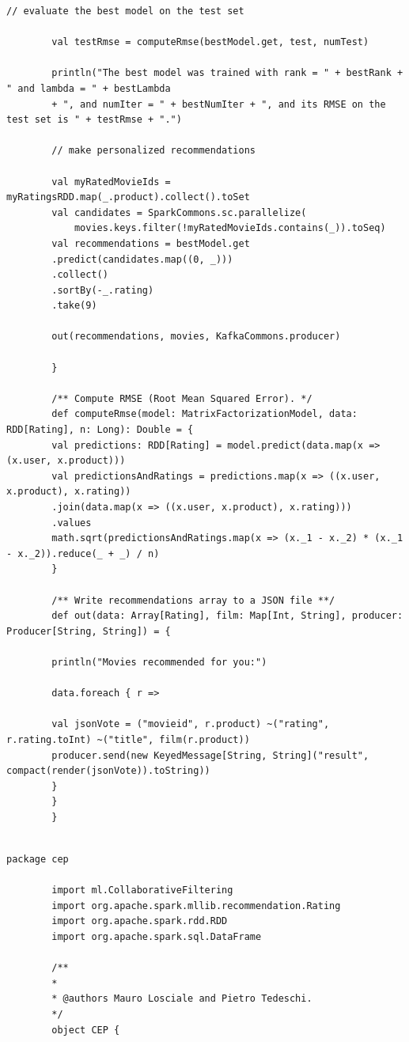 \documentclass[12pt]{article}
\begin{document}
\begin{appendices}
\begin{lstlisting}[style=scalacode, caption=CollaborativeFiltering.scala]
		// evaluate the best model on the test set
		
		val testRmse = computeRmse(bestModel.get, test, numTest)
		
		println("The best model was trained with rank = " + bestRank + " and lambda = " + bestLambda
		+ ", and numIter = " + bestNumIter + ", and its RMSE on the test set is " + testRmse + ".")
		
		// make personalized recommendations
		
		val myRatedMovieIds = myRatingsRDD.map(_.product).collect().toSet
		val candidates = SparkCommons.sc.parallelize(
			movies.keys.filter(!myRatedMovieIds.contains(_)).toSeq)
		val recommendations = bestModel.get
		.predict(candidates.map((0, _)))
		.collect()
		.sortBy(-_.rating)
		.take(9)
		
		out(recommendations, movies, KafkaCommons.producer)
		
		}
		
		/** Compute RMSE (Root Mean Squared Error). */
		def computeRmse(model: MatrixFactorizationModel, data: RDD[Rating], n: Long): Double = {
		val predictions: RDD[Rating] = model.predict(data.map(x => (x.user, x.product)))
		val predictionsAndRatings = predictions.map(x => ((x.user, x.product), x.rating))
		.join(data.map(x => ((x.user, x.product), x.rating)))
		.values
		math.sqrt(predictionsAndRatings.map(x => (x._1 - x._2) * (x._1 - x._2)).reduce(_ + _) / n)
		}
		
		/** Write recommendations array to a JSON file **/
		def out(data: Array[Rating], film: Map[Int, String], producer: Producer[String, String]) = {
		
		println("Movies recommended for you:")
		
		data.foreach { r =>
		
		val jsonVote = ("movieid", r.product) ~("rating", r.rating.toInt) ~("title", film(r.product))
		producer.send(new KeyedMessage[String, String]("result", compact(render(jsonVote)).toString))
		}
		}
		}
		
	\end{lstlisting}
	\begin{lstlisting}[style=scalacode, caption=CEP.scala]
		package cep
		
		import ml.CollaborativeFiltering
		import org.apache.spark.mllib.recommendation.Rating
		import org.apache.spark.rdd.RDD
		import org.apache.spark.sql.DataFrame
		
		/**
		*
		* @authors Mauro Losciale and Pietro Tedeschi.
		*/
		object CEP {
		

\end{lstlisting}
\end{appendices}
\end{document}
